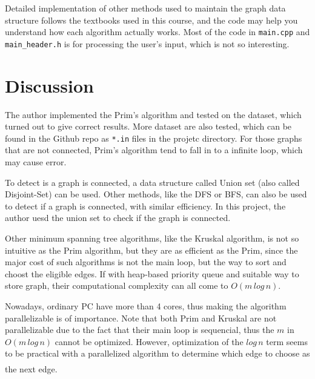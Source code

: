 \documentclass[cn,black,12pt,normal]{elegantnote}
\newcommand{\uct}[1]{\textsuperscript{\textsuperscript{\cite{#1}}}}
\begin{document}
Detailed implementation of other methods used to maintain the graph data structure follows the textbooks used in this course, and the code may help you understand how each algorithm actually works. Most of the code in \lstinline{main.cpp} and \lstinline{main_header.h} is for processing the user's input, which is not so interesting.

\section{Discussion}

The author implemented the Prim's algorithm and tested on the dataset, which turned out to give correct results. More dataset are also tested, which can be found in the Github repo as \lstinline{*.in} files in the projetc directory. For those graphs that are not connected, Prim's algorithm tend to fall in to a infinite loop, which may cause error.

To detect is a graph is connected, a data structure called Union set (also called Disjoint-Set) can be used. Other methods, like the DFS or BFS, can also be used to detect if a graph is connected, with similar efficiency. In this project, the author uesd the union set to check if the graph is connected.


Other minimum spanning tree algorithms, like the Kruskal algorithm, is not so intuitive as the Prim algorithm, but they are as efficient as the Prim, since the major cost of such algorithms is not the main loop, but the way to sort and choost the eligible edges. If with heap-based priority queue and suitable way to store graph, their computational complexity can all come to $O(m\, log\, n)$.

Nowadays, ordinary PC have more than 4 cores, thus making the algorithm parallelizable is of importance. Note that both Prim and Kruskal are not parallelizable due to the fact that their main loop is sequencial, thus the $m$ in $O(m\, log\, n)$ cannot be optimized. However, optimization of the $log\, n$ term seems to be practical with a parallelized algorithm to determine which edge to choose as the next edge.\uct{quinn1984parallel}

\newpage

\end{document}
